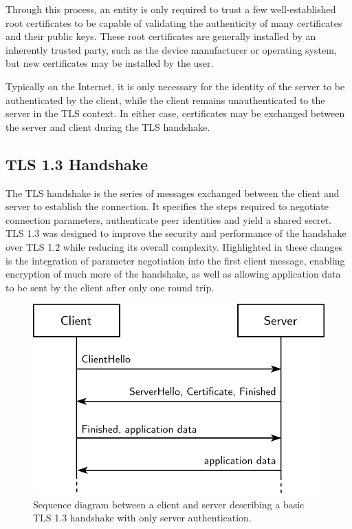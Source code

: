 Through this process, an entity is only required to trust a few well-established root certificates to be capable of validating the authenticity of many certificates and their public keys. These root certificates are generally installed by an inherently trusted party, such as the device manufacturer or operating system, but new certificates may be installed by the user.

Typically on the Internet, it is only necessary for the identity of the server to be authenticated by the client, while the client remains unauthenticated to the server in the TLS context. In either case, certificates may be exchanged between the server and client during the TLS handshake.

\subsection{TLS 1.3 Handshake}

The TLS handshake is the series of messages exchanged between the client and server to establish the connection. It specifies the steps required to negotiate connection parameters, authenticate peer identities and yield a shared secret. TLS 1.3 was designed to improve the security and performance of the handshake over TLS 1.2 while reducing its overall complexity. Highlighted in these changes is the integration of parameter negotiation into the first client message, enabling encryption of much more of the handshake, as well as allowing application data to be sent by the client after only one round trip.

\begin{figure}[ht]
\centerline{\includegraphics[width=120mm]{images/tls-handshake.png}}
\caption[Basic TLS 1.3 handshake]{Sequence diagram between a client and server describing a basic TLS 1.3 handshake with only server authentication.}
\label{tls_handshake_figure}
\end{figure}


